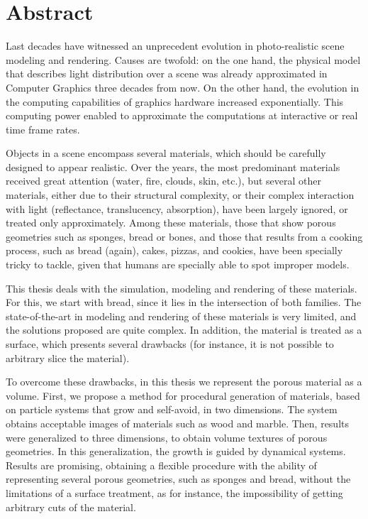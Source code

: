\documentclass[spanish,a4paper,oneside,10pt,openright]{book}
\begin{document}
\phantom{p. 1}
\clearpage
\thispagestyle{empty}

\chapter*{Abstract} %

Last decades have witnessed an unprecedent evolution in photo-realistic scene modeling and rendering.
Causes are twofold: on the one hand, the physical model that describes light distribution over a scene was already approximated in Computer Graphics three decades from now.
On the other hand, the evolution in the computing capabilities of graphics hardware increased exponentially.
This computing power enabled to approximate the computations at interactive or real time frame rates.

Objects in a scene encompass several materials, which should be carefully designed to appear realistic.
Over the years, the most predominant materials received great attention (water, fire, clouds, skin, etc.), but several other materials, either due to their structural complexity, or their complex interaction with light (reflectance, translucency, absorption), have been largely ignored, or treated only approximately.
Among these materials, those that show porous geometries such as sponges, bread or bones, and those that results from a cooking process, such as bread (again), cakes, pizzas, and cookies, have been specially tricky to tackle, given that humans are specially able to spot improper models.

This thesis deals with the simulation, modeling and rendering of these materials.
For this, we start with bread, since it lies in the intersection of both families.
The state-of-the-art in modeling and rendering of these materials is very limited, and the solutions proposed are quite complex.
In addition, the material is treated as a surface, which presents several drawbacks (for instance, it is not possible to arbitrary slice the material).

To overcome these drawbacks, in this thesis we represent the porous material as a volume.
First, we propose a method for procedural generation of materials, based on particle systems that grow and self-avoid, in two dimensions.
The system obtains acceptable images of materials such as wood and marble.
Then, results were generalized to three dimensions, to obtain volume textures of porous geometries.
In this generalization, the growth is guided by dynamical systems.
Results are promising, obtaining a flexible procedure with the ability of representing several porous geometries, such as sponges and bread, without the limitations of a surface treatment, as for instance, the impossibility of getting arbitrary cuts of the material.
\end{document}
